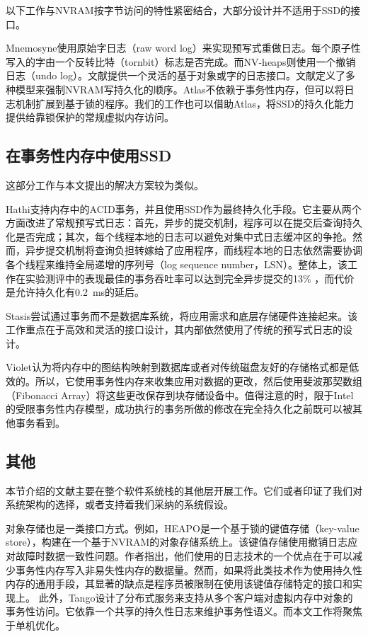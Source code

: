 以下工作与NVRAM按字节访问的特性紧密结合，大部分设计并不适用于SSD的接口。

Mnemosyne\cite{Volos:2011:MLP:1950365.1950379}使用原始字日志（raw word log）来实现预写式重做日志。每个原子性写入的字由一个反转比特（tornbit）标志是否完成。而NV-heaps\cite{Coburn:2011:NMP:1950365.1950380}则使用一个撤销日志（undo log）。文献\cite{Kannan:2014:RCP}提供一个灵活的基于对象或字的日志接口。文献\cite{Pelley:2014:MP}定义了多种模型来强制NVRAM写持久化的顺序。Atlas\cite{Chakrabarti:2014:ALL:2660193.2660224}不依赖于事务性内存，但可以将日志机制扩展到基于锁的程序。我们的工作也可以借助Atlas，将SSD的持久化能力提供给靠锁保护的常规虚拟内存访问。

\subsection{在事务性内存中使用SSD}

这部分工作与本文提出的解决方案较为类似。

Hathi\cite{Saxena:2012:HDT:2236584.2236589}支持内存中的ACID事务，并且使用SSD作为最终持久化手段。它主要从两个方面改进了常规预写式日志：首先，异步的提交机制，程序可以在提交后查询持久化是否完成；其次，每个线程本地的日志可以避免对集中式日志缓冲区的争抢。然而，异步提交机制将查询负担转嫁给了应用程序，而线程本地的日志依然需要协调各个线程来维持全局递增的序列号（log sequence number，LSN）。整体上，该工作在实验测评中的表现最佳的事务吞吐率可以达到完全异步提交的13\% ，而代价是允许持久化有0.2~ms的延后。

Stasis\cite{Sears:2006:SFT:1298455.1298459}尝试通过事务而不是数据库系统，将应用需求和底层存储硬件连接起来。该工作重点在于高效和灵活的接口设计，其内部依然使用了传统的预写式日志的设计。

Violet\cite{Santry:2014:VSS:2643634.2643637}认为将内存中的图结构映射到数据库或者对传统磁盘友好的存储格式都是低效的。所以，它使用事务性内存来收集应用对数据的更改，然后使用斐波那契数组（Fibonacci Array）将这些更改保存到块存储设备中。值得注意的时，限于Intel的受限事务性内存模型，成功执行的事务所做的修改在完全持久化之前既可以被其他事务看到。

\subsection{其他}

本节介绍的文献主要在整个软件系统栈的其他层开展工作。它们或者印证了我们对系统架构的选择，或者支持着我们采纳的系统假设。

对象存储也是一类接口方式。例如，HEAPO\cite{Hwang:2014:HHP:2705611.2629619}是一个基于锁的键值存储（key-value store），构建在一个基于NVRAM的对象存储系统上。该键值存储使用撤销日志应对故障时数据一致性问题。作者指出，他们使用的日志技术的一个优点在于可以减少事务性内存写入非易失性内存的数据量。然而，如果将此类技术作为使用持久性内存的通用手段，其显著的缺点是程序员被限制在使用该键值存储特定的接口和实现上。
此外，Tango\cite{Balakrishnan:2013:TDD:2517349.2522732}设计了分布式服务来支持从多个客户端对虚拟内存中对象的事务性访问。它依靠一个共享的持久性日志来维护事务性语义。而本文工作将聚焦于单机优化。

